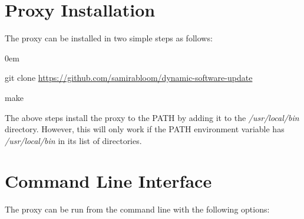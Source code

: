 \documentclass[a4paper,11pt,twoside]{report}
\begin{document}
\section{Proxy Installation}
The proxy can be installed in two simple steps as follows:
\begin{list}{-}{}
  \itemsep0em
  \item git clone \url {https://github.com/samirabloom/dynamic-software-update} 
  \item make
\end{list}

\noindent
The above steps install the proxy to the PATH by adding it to the \textit{/usr/local/bin} directory. However, this will only work if the PATH environment variable has \textit{/usr/local/bin} in its list of directories. 

\section{Command Line Interface}
The proxy can be run from the command line with the following options:\bigskip
\end{document}
